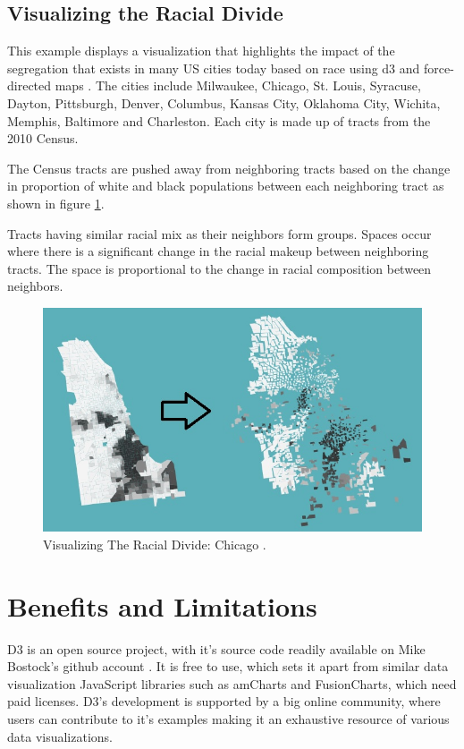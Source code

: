 \documentclass[9pt,twocolumn,twoside]{../../styles/osajnl}
\begin{document}
\subsection{Visualizing the Racial Divide}
This example displays a visualization that highlights the impact of the segregation that exists in many US cities today based on race using d3 and force-directed maps \cite{www-fdm}. The cities include Milwaukee, Chicago, St. Louis, Syracuse, Dayton, Pittsburgh, Denver, Columbus, Kansas City, Oklahoma City, Wichita, Memphis, Baltimore and Charleston. Each city is made up of tracts from the 2010 Census.

The Census tracts are pushed away from neighboring tracts based on the change in proportion of white and black populations between each neighboring tract as shown in figure \ref{fig:chicago}.

Tracts having similar racial mix as their neighbors form groups. Spaces occur where there is a significant change in the racial makeup between neighboring tracts. The space is proportional to the change in racial composition between neighbors. 

\begin{figure}[h]
\centering
\includegraphics[scale=0.4]{images/4}
\centering
\caption{Visualizing The Racial Divide: Chicago \cite{www-chicago}.}
\label{fig:chicago}
\end{figure}




\section{Benefits and Limitations}
D3 is an open source project, with it's source code readily available on Mike Bostock's github account \cite{www-mike}. It is free to use, which sets it apart from similar data visualization JavaScript libraries such as amCharts and FusionCharts, which need paid licenses. D3's development is supported by a big online community, where users can contribute to it's examples making it an exhaustive resource of various data visualizations. 
\end{document}
